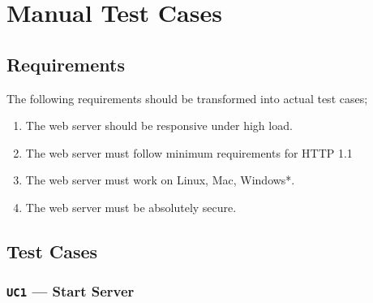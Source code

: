 %
%
%


\section{Manual Test Cases}
%
%


%


\subsection{Requirements}
The following requirements should be transformed into actual test cases;
\begin{enumerate}
  \item The web server should be responsive under high load.
  \item The web server must follow minimum requirements for HTTP 1.1
  \item The web server must work on Linux, Mac, Windows*.
  \item The web server must be absolutely secure.
\end{enumerate}


\subsection{Test Cases}
\subsubsection{\texttt{UC1} --- Start Server}

